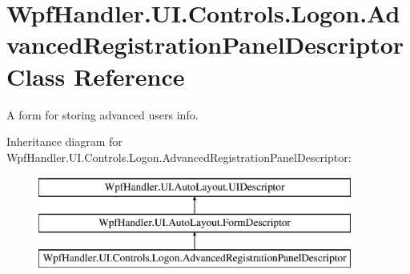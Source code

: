 \hypertarget{class_wpf_handler_1_1_u_i_1_1_controls_1_1_logon_1_1_advanced_registration_panel_descriptor}{}\section{Wpf\+Handler.\+U\+I.\+Controls.\+Logon.\+Advanced\+Registration\+Panel\+Descriptor Class Reference}
\label{class_wpf_handler_1_1_u_i_1_1_controls_1_1_logon_1_1_advanced_registration_panel_descriptor}


A form for storing advanced user\textquotesingle{}s info.  


Inheritance diagram for Wpf\+Handler.\+U\+I.\+Controls.\+Logon.\+Advanced\+Registration\+Panel\+Descriptor\+:\begin{figure}[H]
\begin{center}
\leavevmode
\includegraphics[height=3.000000cm]{dd/d32/class_wpf_handler_1_1_u_i_1_1_controls_1_1_logon_1_1_advanced_registration_panel_descriptor}
\end{center}
\end{figure}
